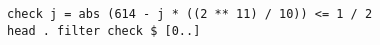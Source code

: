 \begin{verbatim}
check j = abs (614 - j * ((2 ** 11) / 10)) <= 1 / 2
head . filter check $ [0..]
\end{verbatim}
